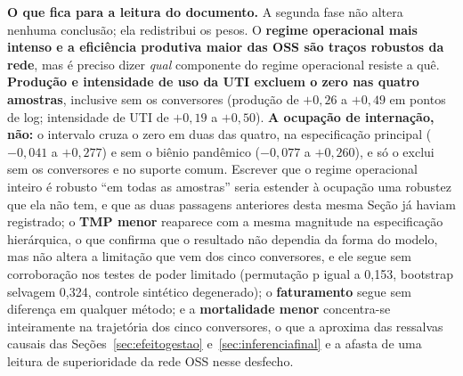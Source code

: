 \newpage
\textbf{O que fica para a leitura do documento.} A segunda fase não
altera nenhuma conclusão; ela redistribui os pesos. O \textbf{regime
operacional mais intenso e a eficiência produtiva maior das OSS são
traços robustos da rede}, mas é preciso dizer \emph{qual} componente do
regime operacional resiste a quê. \textbf{Produção e intensidade de uso
da UTI excluem o zero nas quatro amostras}, inclusive sem os
conversores (produção de $+0{,}26$ a $+0{,}49$ em pontos de log;
intensidade de UTI de $+0{,}19$ a $+0{,}50$). \textbf{A ocupação de
internação, não:} o intervalo cruza o zero em duas das quatro, na
especificação principal ($-0{,}041$ a $+0{,}277$) e sem o biênio
pandêmico ($-0{,}077$ a $+0{,}260$), e só o exclui sem os
conversores e no suporte comum. Escrever que o regime operacional
inteiro é robusto ``em todas as amostras'' seria estender à ocupação
uma robustez que ela não tem, e que as duas passagens anteriores desta
mesma Seção já haviam registrado; o \textbf{TMP menor} reaparece
com a mesma magnitude na especificação hierárquica, o que confirma que
o resultado não dependia da forma do modelo, mas não altera a
limitação que vem dos cinco conversores, e ele segue sem corroboração
nos testes de poder limitado (permutação p igual a 0,153, bootstrap
selvagem 0,324, controle sintético degenerado); o \textbf{faturamento} segue sem
diferença em qualquer método; e a \textbf{mortalidade menor}
concentra-se inteiramente na trajetória dos cinco conversores, o
que a aproxima das ressalvas causais das
Seções~\ref{sec:efeitogestao} e~\ref{sec:inferenciafinal} e a afasta
de uma leitura de superioridade da rede OSS nesse desfecho.
